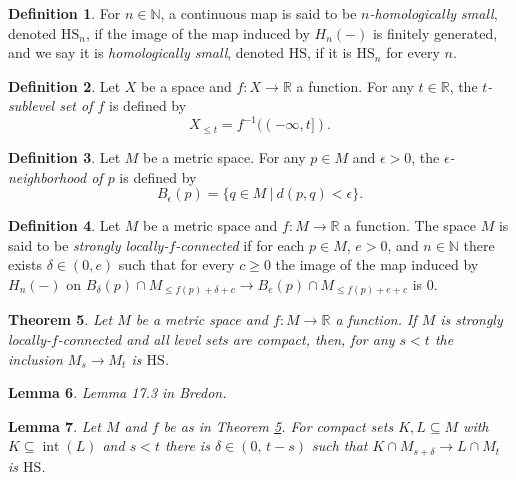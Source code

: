 \documentclass{amsart}
\newtheorem{theorem}{Theorem}
\newtheorem{lemma}[theorem]{Lemma}
\theoremstyle{definition}
\newtheorem{definition}[theorem]{Definition}
\newcommand{\N}{\mathbb{N}}
\newcommand{\R}{\mathbb{R}}
\newcommand{\HS}{\mathrm{HS}}
\DeclareMathOperator{\interior}{int}
\begin{document}
\begin{definition}
	For $n \in \N$, a continuous map is said to be \textit{$n$-homologically small}, denoted $\HS_n$, if the image of the map induced by $H_n(-)$ is finitely generated, and we say it is \textit{homologically small}, denoted $\HS$, if it is $\HS_n$ for every $n$.
\end{definition}

\begin{definition}
	Let $X$ be a space and $f \colon X \to \R$ a function. For any $t \in \R$, the \textit{$t$-sublevel set of $f$} is defined by 
	\begin{equation*}
	X_{\leq t} = f^{-1}((-\infty, t]).
	\end{equation*}
\end{definition}

\begin{definition}
	Let $M$ be a metric space. For any $p \in M$ and $\epsilon > 0$, the \textit{$\epsilon$-neighborhood of $p$} is defined by
	\begin{equation*}
	B_\epsilon(p) = \{q \in M\ |\ d(p,q) < \epsilon\}.
	\end{equation*}
\end{definition}

\begin{definition}
	Let $M$ be a metric space and $f \colon M \to \R$ a function.
	The space $M$ is said to be \textit{strongly locally-$f$-connected} if for each $p \in M$, $e > 0$, and $n \in \N$ there exists $\delta \in (0, e)$ such that for every $c \geq 0$ the image of the map induced by $H_n(-)$ on $B_\delta(p) \cap M_{\leq f(p)+\delta+c} \to B_e(p) \cap M_{\leq f(p)+e+c}$ is $0$.
\end{definition}

\begin{theorem} \label{t:strong local connectenss implies tameness}
	Let $M$ be a metric space and $f \colon M \to \R$ a function. If $M$ is strongly locally-$f$-connected and all level sets are compact, then, for any $s < t$ the inclusion $M_s \to M_t$ is $\HS$.
\end{theorem}

\begin{lemma} \label{l:commutative algebra}
	Lemma 17.3 in Bredon.	
\end{lemma}

\begin{lemma}
	Let $M$ and $f$ be as in Theorem \ref{t:strong local connectenss implies tameness}.
	For compact sets $K, L \subseteq M$ with $K \subseteq \interior(L)$ and $s < t$ there is $\delta \in (0,\, t-s)$ such that $K \cap M_{s+\delta} \to L \cap M_{t}$ is $\HS$.
\end{lemma}
\end{document}
